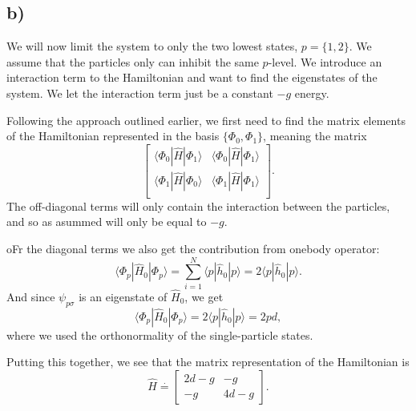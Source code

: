 \documentclass[a4paper, 11pt, notitlepage, english]{article}
\newcommand{\op}[1]{\hat{#1}}
\newcommand{\braopket}[3]{\langle #1 | {#2} | #3 \rangle}
\begin{document}
\subsection*{b)}
We will now limit the system to only the two lowest states, $p=\{1,2\}$. We assume that the particles only can inhibit the same $p$-level. We introduce an interaction term to the Hamiltonian and want to find the eigenstates of the system. We let the interaction term just be a constant $-g$ energy.

Following the approach outlined earlier, we first need to find the matrix elements of the Hamiltonian represented in the basis $\{\Phi_0, \Phi_1\}$, meaning the matrix
$$
\begin{bmatrix}
\braopket{\Phi_0}{\op{H}}{\Phi_1} & \braopket{\Phi_0}{\op{H}}{\Phi_1} \\
\braopket{\Phi_1}{\op{H}}{\Phi_0} & \braopket{\Phi_1}{\op{H}}{\Phi_1} \\
\end{bmatrix}.
$$
The off-diagonal terms will only contain the interaction between the particles, and so as asummed will only be equal to $-g$.

oFr the diagonal terms we also get the contribution from onebody operator:
$$\braopket{\Phi_p}{\op{H}_0}{\Phi_p} = \sum_{i=1}^N \braopket{p}{\op{h}_0}{p} = 2\braopket{p}{\op{h}_0}{p}.$$
And since $\psi_{p\sigma}$ is an eigenstate of $\op{H}_0$, we get
$$\braopket{\Phi_p}{\op{H}_0}{\Phi_p} = 2\braopket{p}{\op{h}_0}{p} = 2pd,$$
where we used the orthonormality of the single-particle states.

Putting this together, we see that the matrix representation of the Hamiltonian is 
$$\op{H} \overset{\cdot}{=} \begin{bmatrix}
2d -g & -g \\
-g & 4d -g 
\end{bmatrix}.$$
\end{document}
